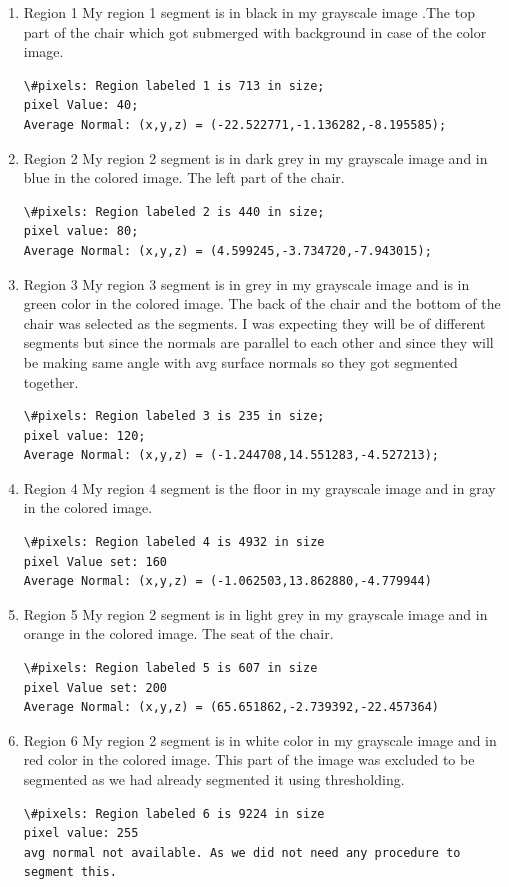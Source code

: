 \documentclass{article}
\begin{document}
\begin{enumerate}
\item{Region 1}
My region 1 segment is in black in my grayscale image .The top part of the chair which got submerged with background in case of the color image.

\begin{lstlisting}
\#pixels: Region labeled 1 is 713 in size;
pixel Value: 40;
Average Normal: (x,y,z) = (-22.522771,-1.136282,-8.195585);
\end{lstlisting}

\item{Region 2}
My region 2 segment is in dark grey in my grayscale image and in blue in the colored image. The left part of the chair.

\begin{lstlisting}
\#pixels: Region labeled 2 is 440 in size;
pixel value: 80;
Average Normal: (x,y,z) = (4.599245,-3.734720,-7.943015);
\end{lstlisting}


\item{Region 3}
My region 3 segment is in grey in my grayscale image and is in green color in the colored image. The back of the chair and the bottom of the chair was selected as the segments. I was expecting they will be of different segments but since the normals are parallel to each other and since they will be making same angle with avg surface normals so they got segmented together.

\begin{lstlisting}
\#pixels: Region labeled 3 is 235 in size;
pixel value: 120;
Average Normal: (x,y,z) = (-1.244708,14.551283,-4.527213);
\end{lstlisting}

\item{Region 4} 
My region 4 segment is the floor in my grayscale image and in gray in the colored image. 
\begin{lstlisting}
\#pixels: Region labeled 4 is 4932 in size
pixel Value set: 160
Average Normal: (x,y,z) = (-1.062503,13.862880,-4.779944)
\end{lstlisting}
\item{Region 5} 
My region 2 segment is in light grey in my grayscale image and in orange in the colored image. The seat of the chair.

\begin{lstlisting}
\#pixels: Region labeled 5 is 607 in size
pixel Value set: 200
Average Normal: (x,y,z) = (65.651862,-2.739392,-22.457364)
\end{lstlisting}


\item{Region 6} 
My region 2 segment is in white color in my grayscale image and in red color in the colored image. This part of the image was excluded to be segmented as we had already segmented it using thresholding.

\begin{lstlisting}
\#pixels: Region labeled 6 is 9224 in size
pixel value: 255
avg normal not available. As we did not need any procedure to segment this.
\end{lstlisting}

\end{enumerate}
\end{document}
